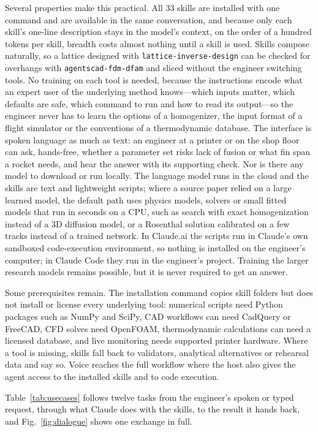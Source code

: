 \documentclass[11pt]{article}
\newcommand{\skill}[1]{\texttt{#1}}
\begin{document}
Several properties make this practical. All 33 skills are installed with one command and are
available in the same conversation, and because only each skill's one-line description stays in the
model's context, on the order of a hundred tokens per skill, breadth costs almost nothing until a
skill is used. Skills compose naturally, so a lattice designed with \skill{lattice-inverse-design}
can be checked for overhangs with \skill{agentscad-fdm-dfam} and sliced without the engineer
switching tools. No training on each tool is needed, because the instructions encode what an expert
user of the underlying method knows---which inputs matter, which defaults are safe, which command to
run and how to read its output---so the engineer never has to learn the options of a homogenizer,
the input format of a flight simulator or the conventions of a thermodynamic database. The interface
is spoken language as much as text: an engineer at a printer or on the shop floor can ask,
hands-free, whether a parameter set risks lack of fusion or what fin span a rocket needs, and hear
the answer with its supporting check. Nor is there any model to download or run locally. The
language model runs in the cloud and the skills are text and lightweight scripts; where a source
paper relied on a large learned model, the default path uses physics models, solvers or small fitted
models that run in seconds on a CPU, such as search with exact homogenization instead of a 3D
diffusion model, or a Rosenthal solution calibrated on a few tracks instead of a trained network. In
Claude.ai the scripts run in Claude's own sandboxed code-execution environment, so nothing is
installed on the engineer's computer; in Claude Code they run in the engineer's project. Training the
larger research models remains possible, but it is never required to get an answer.

Some prerequisites remain. The installation command copies skill folders but does not install or
license every underlying tool: numerical scripts need Python packages such as NumPy and SciPy, CAD
workflows can need CadQuery or FreeCAD, CFD solves need OpenFOAM, thermodynamic calculations can need
a licensed database, and live monitoring needs supported printer hardware. Where a tool is missing,
skills fall back to validators, analytical alternatives or rehearsal data and say so. Voice reaches
the full workflow where the host also gives the agent access to the installed skills and to code
execution.

Table~\ref{tab:usecases} follows twelve tasks from the engineer's spoken or typed request, through
what Claude does with the skills, to the result it hands back, and Fig.~\ref{fig:dialogue} shows one
exchange in full.
\end{document}
